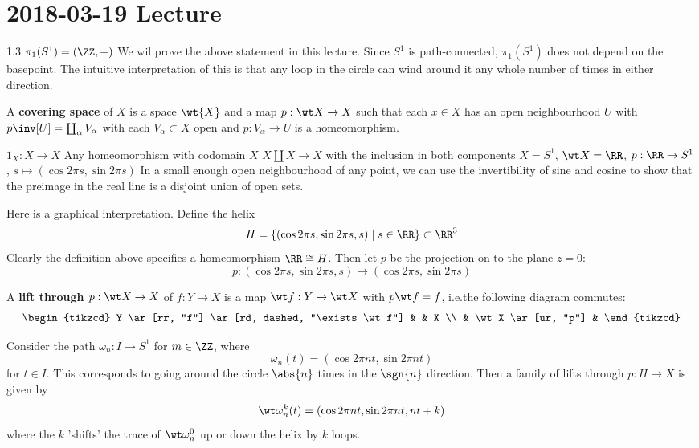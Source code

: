 \section{2018-03-19 Lecture}

1.3 $\pi_1(S^1)=(\ZZ,+)$
We wil prove the above statement in this lecture.
Since $S^1$ is path-connected, $\pi_1(S^1)$ does not depend on the basepoint.
The intuitive interpretation of this is that any loop in the circle can wind around it any whole number of times in either direction.

\begin{defn}
	A \textbf{covering space} of $X$ is a space $\wt{X}$ and a map $p: \wt X \to X$ such that each $x \in X$ has an open neighbourhood $U$ with $p\inv[U] = \coprod_\alpha V_\alpha$ with each $V_\alpha \subset X$ open and $p: V_\alpha \to U$ is a homeomorphism.
\end{defn}

\begin{exam}
	\begin{itm}
		\io $1_X: X \to X$
		\io Any homeomorphism with codomain $X$
		\io $X \amalg X \to X$ with the inclusion in both components
		\io $X=S^1$, $\wt X = \RR$, $p: \RR \to S^1$, $s \mapsto (\cos 2\pi s, \sin 2\pi s)$
		In a small enough open neighbourhood of any point, we can use the invertibility of sine and cosine to show that the preimage in the real line is a disjoint union of open sets.
		
		Here is a graphical interpretation.
		Define the helix
		\[H = \{(\cos 2\pi s, \sin 2\pi s, s) \mid s \in \RR\} \subset \RR^3\]
		Clearly the definition above specifies a homeomorphism $\RR \cong H$.
		Then let $p$ be the projection on to the plane $z=0$:
		\[p: (\cos 2\pi s, \sin 2\pi s, s) \mapsto (\cos 2\pi s, \sin 2\pi s)\]
	\end{itm}
\end{exam}

\begin{defn}
	A \textbf{lift through $p: \wt X \to X$} of $f: Y \to X$ is a map $\wt f: Y \to \wt X$ with $p \wt f = f$, i.e.\@ the following diagram commutes:
	\[
		\begin{tikzcd}
			Y \ar[rr, "f"] \ar[rd, dashed, "\exists \wt f"] & & X \\
			& \wt X \ar[ur, "p"] &
		\end{tikzcd}
	\]
\end{defn}

\begin{exam}
	Consider the path $\omega_n: I \to S^1$ for $m \in \ZZ$, where
	\[\omega_n(t) = (\cos 2\pi nt, \sin 2\pi nt)\]
	for $t \in I$.
	This corresponds to going around the circle $\abs{n}$ times in the $\sgn{n}$ direction.
	Then a family of lifts through $p: H \to X$ is given by
	\[\wt\omega_n^k(t) = (\cos 2\pi nt, \sin 2\pi nt, nt+k)\]
	where the $k$ 'shifts' the trace of $\wt\omega_n^0$ up or down the helix by $k$ loops.
\end{exam}

